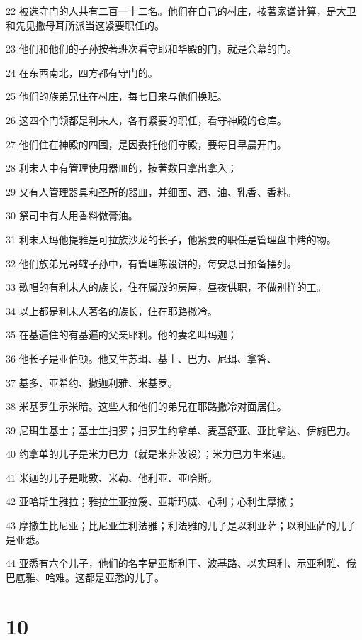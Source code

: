 \par 22 被选守门的人共有二百一十二名。他们在自己的村庄，按著家谱计算，是大卫和先见撒母耳所派当这紧要职任的。
\par 23 他们和他们的子孙按著班次看守耶和华殿的门，就是会幕的门。
\par 24 在东西南北，四方都有守门的。
\par 25 他们的族弟兄住在村庄，每七日来与他们换班。
\par 26 这四个门领都是利未人，各有紧要的职任，看守神殿的仓库。
\par 27 他们住在神殿的四围，是因委托他们守殿，要每日早晨开门。
\par 28 利未人中有管理使用器皿的，按著数目拿出拿入；
\par 29 又有人管理器具和圣所的器皿，并细面、酒、油、乳香、香料。
\par 30 祭司中有人用香料做膏油。
\par 31 利未人玛他提雅是可拉族沙龙的长子，他紧要的职任是管理盘中烤的物。
\par 32 他们族弟兄哥辖子孙中，有管理陈设饼的，每安息日预备摆列。
\par 33 歌唱的有利未人的族长，住在属殿的房屋，昼夜供职，不做别样的工。
\par 34 以上都是利未人著名的族长，住在耶路撒冷。
\par 35 在基遍住的有基遍的父亲耶利。他的妻名叫玛迦；
\par 36 他长子是亚伯顿。他又生苏珥、基士、巴力、尼珥、拿答、
\par 37 基多、亚希约、撒迦利雅、米基罗。
\par 38 米基罗生示米暗。这些人和他们的弟兄在耶路撒冷对面居住。
\par 39 尼珥生基士；基士生扫罗；扫罗生约拿单、麦基舒亚、亚比拿达、伊施巴力。
\par 40 约拿单的儿子是米力巴力（就是米非波设）；米力巴力生米迦。
\par 41 米迦的儿子是毗敦、米勒、他利亚、亚哈斯。
\par 42 亚哈斯生雅拉；雅拉生亚拉篾、亚斯玛威、心利；心利生摩撒；
\par 43 摩撒生比尼亚；比尼亚生利法雅；利法雅的儿子是以利亚萨；以利亚萨的儿子是亚悉。
\par 44 亚悉有六个儿子，他们的名字是亚斯利干、波基路、以实玛利、示亚利雅、俄巴底雅、哈难。这都是亚悉的儿子。

\chapter{10}


